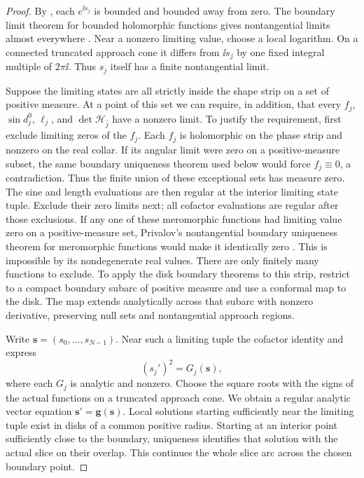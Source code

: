 \begin{proof}
By , each \(e^{\ii s_j}\) is bounded and bounded away
from zero.  The boundary limit theorem for bounded holomorphic functions
gives nontangential limits almost everywhere
\cite[Chapter~I, Theorem~5.3]{Garnett2007}.  Near a nonzero limiting
value, choose a local logarithm.  On a connected truncated approach cone
it differs from \(\ii s_j\) by one fixed integral multiple of \(2\pi\ii\).
Thus \(s_j\) itself has a finite nontangential limit.

Suppose the limiting states are all strictly inside the shape strip on a
set of positive measure.  At a point of this set we can require, in
addition, that every \(f_j\), \(\sin d_j^0\), \(\ell_j\), and
\(\det\mathcal H_{\widehat j}\) have a nonzero limit.  To justify the
requirement, first exclude limiting zeros of the \(f_j\).  Each \(f_j\)
is holomorphic on the phase strip and nonzero on the real collar.  If its
angular limit were zero on a positive-measure subset, the same boundary
uniqueness theorem used below would force \(f_j\equiv0\), a contradiction.
Thus the finite union of these exceptional sets has measure zero.
The sine and length evaluations are then regular at the interior limiting
state tuple. Exclude their zero limits next; all cofactor evaluations are
regular after those exclusions. If any one of these meromorphic functions
had limiting value zero
on a positive-measure set, Privalov's nontangential boundary uniqueness
theorem for meromorphic functions would make it identically zero
\cite[Chapter~II, p.~91]{Garnett2007}.  This is impossible by its
nondegenerate real values.  There are only finitely many functions to
exclude.  To apply the disk boundary theorems to this strip, restrict to a
compact boundary subarc of positive measure and use a conformal map to the
disk.  The map extends analytically across that subarc with nonzero
derivative, preserving null sets and nontangential approach regions.

Write \(\mathbf s=(s_0,\ldots,s_{N-1})\).  Near such a limiting tuple the
cofactor identity and  express
\[
 (s_j')^2=G_j(\mathbf s),
\]
where each \(G_j\) is analytic and nonzero.  Choose the square roots with
the signs of the actual functions on a truncated approach cone.  We obtain
a regular analytic vector equation
\(\mathbf s'=\mathbf g(\mathbf s)\).  Local solutions starting sufficiently
near the limiting tuple exist in disks of a common positive radius.
Starting at an interior point sufficiently close to the boundary, uniqueness
identifies that solution with the actual slice on their overlap.  This
continues the whole slice arc across the chosen boundary point.


\end{proof}
